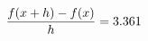 \documentclass[preview]{standalone}
\begin{document}
\begin{align*}
\special{dvisvgm:raw <g id='unique000'>}\frac{f(x+h)-f(x)}{h} = 3.361\special{dvisvgm:raw </g>}
\end{align*}
\end{document}
